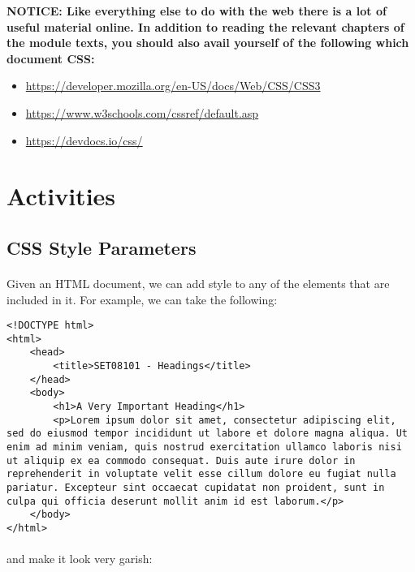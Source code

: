 \documentclass[10pt, a4paper]{article}
\begin{document}
\begin{framed}
{\bf{NOTICE:} Like everything else to do with the web there is a lot of useful material online. In addition to reading the relevant chapters of the module texts, you should also avail yourself of the following which document CSS:
\begin{itemize}
\item \url{https://developer.mozilla.org/en-US/docs/Web/CSS/CSS3}
\item \url{https://www.w3schools.com/cssref/default.asp}
\item \url{https://devdocs.io/css/}
\end{itemize}

}
\end{framed}


\section{Activities}

\subsection{CSS Style Parameters}
\paragraph{} Given an HTML document, we can add style to any of the elements that are included in it. For example, we can take the following:

\begin{lstlisting}
<!DOCTYPE html>
<html>
    <head>
        <title>SET08101 - Headings</title>
    </head>
    <body>
        <h1>A Very Important Heading</h1>
        <p>Lorem ipsum dolor sit amet, consectetur adipiscing elit, sed do eiusmod tempor incididunt ut labore et dolore magna aliqua. Ut enim ad minim veniam, quis nostrud exercitation ullamco laboris nisi ut aliquip ex ea commodo consequat. Duis aute irure dolor in reprehenderit in voluptate velit esse cillum dolore eu fugiat nulla pariatur. Excepteur sint occaecat cupidatat non proident, sunt in culpa qui officia deserunt mollit anim id est laborum.</p>
    </body>
</html>
\end{lstlisting}

\paragraph{} and make it look very garish:
\end{document}
